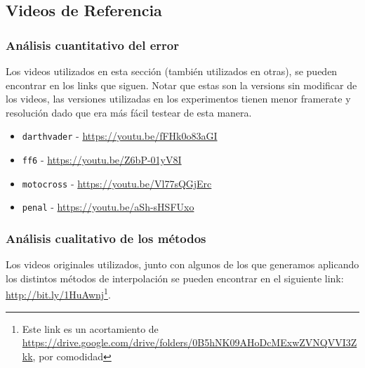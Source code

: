 \subsection{Videos de Referencia}
\label{sec:links}


\subsubsection{Análisis cuantitativo del error}

Los videos utilizados en esta sección (también utilizados en otras), se pueden encontrar en los links que siguen. Notar que estas son la versions sin modificar de los videos, las versiones utilizadas en los experimentos tienen menor framerate y resolución dado que era más fácil testear de esta manera.

\begin{itemize}
    \item \texttt{darthvader} - \url{https://youtu.be/fFHk0o83aGI}
    \item \texttt{ff6} - \url{https://youtu.be/Z6bP-01yV8I}
    \item \texttt{motocross} - \url{https://youtu.be/Vl77sQGjErc}
    \item \texttt{penal} - \url{https://youtu.be/aSh-sHSFUxo}
\end{itemize}


\subsubsection{Análisis cualitativo de los métodos}
Los videos originales utilizados, junto con algunos de los que generamos aplicando los distintos métodos de interpolación se pueden encontrar en el siguiente link: \url{http://bit.ly/1HuAwnj}\footnote{Este link es un acortamiento de \newline \url{https://drive.google.com/drive/folders/0B5hNK09AHoDcMExwZVNQVVI3Zkk}, por comodidad}.

\printbibliography


